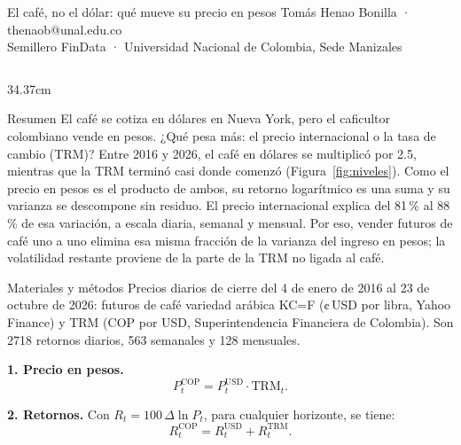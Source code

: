 \documentclass[final]{beamer}
\begin{document}
\begin{frame}[t]

\wsPosterHeader
  {El café, no el dólar: qué mueve su precio en pesos}
  {Tomás Henao Bonilla · thenaob@unal.edu.co\\
  Semillero FinData · Universidad Nacional de Colombia, Sede Manizales
  }

\begin{columns}[T,onlytextwidth]

\begin{column}{34.37cm}

\begin{block}{Resumen}
El café se cotiza en dólares en Nueva York, pero el caficultor colombiano vende en pesos. ¿Qué pesa más: el precio internacional o la tasa de cambio (TRM)? Entre 2016 y 2026, el café en dólares se multiplicó por 2.5, mientras que la TRM terminó casi donde comenzó (Figura~\ref{fig:niveles}). Como el precio en pesos es el producto de ambos, su retorno logarítmico es una suma y su varianza se descompone sin residuo. El precio internacional explica del 81\,\% al 88\,\% de esa variación, a escala diaria, semanal y mensual. Por eso, vender futuros de café uno a uno elimina esa misma fracción de la varianza del ingreso en pesos; la volatilidad restante proviene de la parte de la TRM no ligada al café.
\end{block}

\begin{block}{Materiales y métodos}
Precios diarios de cierre del 4 de enero de 2016 al 23 de octubre de 2026: futuros de café variedad arábica KC=F (¢\,USD por libra, Yahoo Finance) y TRM (COP por USD, Superintendencia Financiera de Colombia). Son 2718 retornos diarios, 563 semanales y 128 mensuales.

\textbf{1. Precio en pesos.}
\begin{equation}
  P^{\mathrm{COP}}_t = P^{\mathrm{USD}}_t \cdot \mathrm{TRM}_t .
\end{equation}

\textbf{2. Retornos.} Con $R_t = 100\, \Delta \ln P_t$, para cualquier horizonte, se tiene:
\begin{equation}
  R^{\mathrm{COP}}_t = R^{\mathrm{USD}}_t + R^{\mathrm{TRM}}_t .
\end{equation}


\end{block}
\end{column}
\end{columns}
\end{frame}
\end{document}
